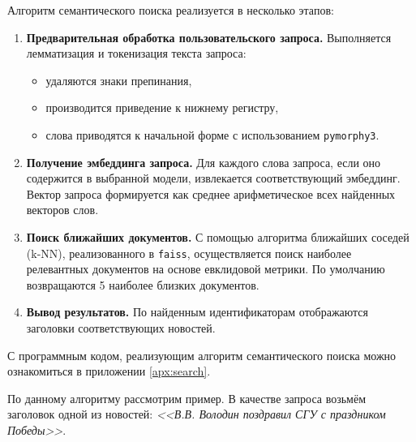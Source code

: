 \documentclass[coursework]{SCWorks}
\begin{document}
Алгоритм семантического поиска реализуется в несколько этапов:
\begin{enumerate}
    \item \textbf{Предварительная обработка пользовательского запроса.}
    Выполняется лемматизация и токенизация текста запроса:
    \begin{itemize}
        \item удаляются знаки препинания,
        \item производится приведение к нижнему регистру,
        \item слова приводятся к начальной форме с использованием \texttt{pymorphy3}.
    \end{itemize}

    \item \textbf{Получение эмбеддинга запроса.}
    Для каждого слова запроса, если оно содержится в выбранной модели, извлекается соответствующий эмбеддинг. Вектор запроса формируется как среднее арифметическое всех найденных векторов слов.

    \item \textbf{Поиск ближайших документов.}
    С помощью алгоритма ближайших соседей (k-NN), реализованного в \texttt{faiss}, осуществляется поиск наиболее релевантных документов на основе евклидовой метрики. По умолчанию возвращаются 5 наиболее близких документов.

    \item \textbf{Вывод результатов.}
    По найденным идентификаторам отображаются заголовки соответствующих новостей.
\end{enumerate}

С программным кодом, реализующим алгоритм семантического поиска можно ознакомиться в приложении \ref{apx:search}.

По данному алгоритму рассмотрим пример. В качестве запроса возьмём заголовок одной из новостей: \textit{<<В.В. Володин поздравил СГУ с праздником Победы>>}.
\end{document}
